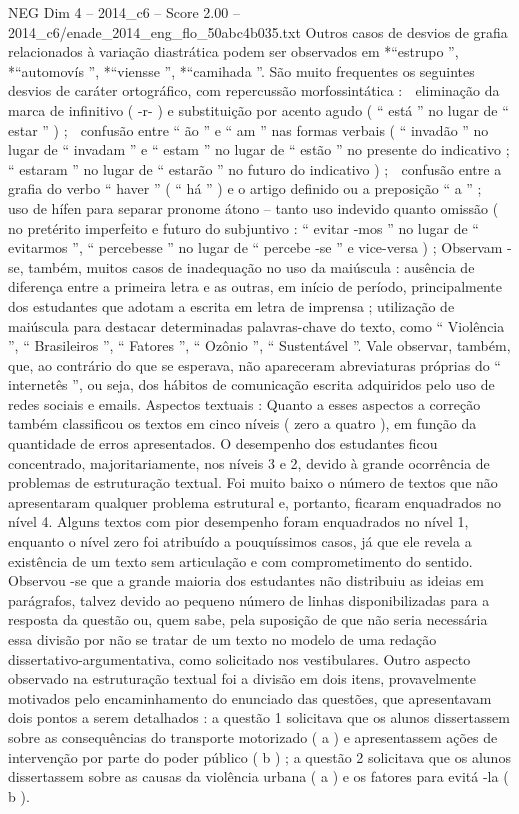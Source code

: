 \begin{textsample}{NEG Dim 4 – 2014\_c6 – Score 2.00 – 2014\_c6/enade\_2014\_eng\_flo\_50abc4b035.txt}
Outros casos de desvios de grafia relacionados à variação diastrática podem ser observados em *“estrupo ”, *“automovís ”, *“viensse ”, *“camihada ”.
São muito frequentes os seguintes desvios de caráter ortográfico, com repercussão morfossintática :  eliminação da marca de infinitivo ( -r- ) e substituição por acento agudo ( “ está ” no lugar de “ estar ” ) ;  confusão entre “ ão ” e “ am ” nas formas verbais ( “ invadão ” no lugar de “ invadam ” e “ estam ” no lugar de “ estão ” no presente do indicativo ; “ estaram ” no lugar de “ estarão ” no futuro do indicativo ) ;  confusão entre a grafia do verbo “ haver ” ( “ há ” ) e o artigo definido ou a preposição “ a ” ;  uso de hífen para separar pronome átono – tanto uso indevido quanto omissão ( no pretérito imperfeito e futuro do subjuntivo : “ evitar -mos ” no lugar de “ evitarmos ”, “ percebesse ” no lugar de “ percebe -se ” e vice-versa ) ; Observam -se, também, muitos casos de inadequação no uso da maiúscula : ausência de diferença entre a primeira letra e as outras, em início de período, principalmente dos estudantes que adotam a escrita em letra de imprensa ; utilização de maiúscula para destacar determinadas palavras-chave do texto, como “ Violência ”, “ Brasileiros ”, “ Fatores ”, “ Ozônio ”, “ Sustentável ”.
Vale observar, também, que, ao contrário do que se esperava, não apareceram abreviaturas próprias do “ internetês ”, ou seja, dos hábitos de comunicação escrita adquiridos pelo uso de redes sociais e emails.
Aspectos textuais : Quanto a esses aspectos a correção também classificou os textos em cinco níveis ( zero a quatro ), em função da quantidade de erros apresentados.
O desempenho dos estudantes ficou concentrado, majoritariamente, nos níveis 3 e 2, devido à grande ocorrência de problemas de estruturação textual.
Foi muito baixo o número de textos que não apresentaram qualquer problema estrutural e, portanto, ficaram enquadrados no nível 4.
Alguns textos com pior desempenho foram enquadrados no nível 1, enquanto o nível zero foi atribuído a pouquíssimos casos, já que ele revela a existência de um texto sem articulação e com comprometimento do sentido.
Observou -se que a grande maioria dos estudantes não distribuiu as ideias em parágrafos, talvez devido ao pequeno número de linhas disponibilizadas para a resposta da questão ou, quem sabe, pela suposição de que não seria necessária essa divisão por não se tratar de um texto no modelo de uma redação dissertativo-argumentativa, como solicitado nos vestibulares.
Outro aspecto observado na estruturação textual foi a divisão em dois itens, provavelmente motivados pelo encaminhamento do enunciado das questões, que apresentavam dois pontos a serem detalhados : a questão 1 solicitava que os alunos dissertassem sobre as consequências do transporte motorizado ( a ) e apresentassem ações de intervenção por parte do poder público ( b ) ; a questão 2 solicitava que os alunos dissertassem sobre as causas da violência urbana ( a ) e os fatores para evitá -la ( b ).

\end{textsample}
